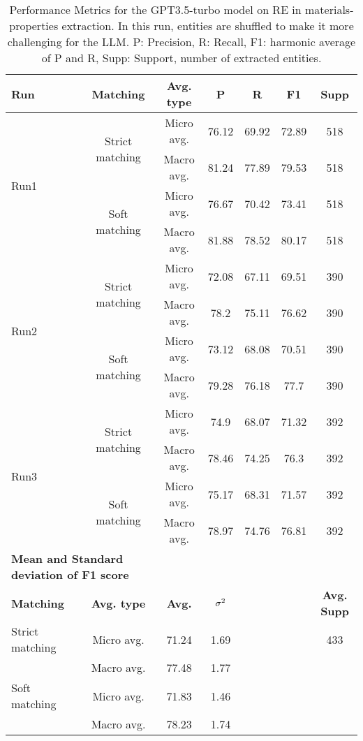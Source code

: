 \begin{table}[htbp]
    \small
    \centering
    \caption{Performance Metrics for the GPT3.5-turbo model on RE in materials-properties extraction. In this run, entities are shuffled to make it more challenging for the LLM. P: Precision, R: Recall, F1: harmonic average of P and R, Supp: Support, number of extracted entities.}
    \begin{tabular}{lcccccc}
        \toprule
        \textbf{Run} & \textbf{Matching} & \textbf{Avg. type} & \textbf{P} & \textbf{R} & \textbf{F1} & \textbf{Supp} \\
        \midrule
        \multirow{4}{*}{Run1} & \multirow{2}{*}{Strict matching} & Micro avg. & 76.12 & 69.92 & 72.89 & 518 \\
        & & Macro avg. & 81.24 & 77.89 & 79.53 & 518 \\
        \cmidrule{2-7}
        & \multirow{2}{*}{Soft matching} & Micro avg. & 76.67 & 70.42 & 73.41 & 518 \\
        & & Macro avg. & 81.88 & 78.52 & 80.17 & 518 \\
        \midrule
        \multirow{4}{*}{Run2} & \multirow{2}{*}{Strict matching} & Micro avg. & 72.08 & 67.11 & 69.51 & 390 \\
        & & Macro avg. & 78.2 & 75.11 & 76.62 & 390 \\
        \cmidrule{2-7}
        & \multirow{2}{*}{Soft matching} & Micro avg. & 73.12 & 68.08 & 70.51 & 390 \\
        & & Macro avg. & 79.28 & 76.18 & 77.7 & 390 \\
        \midrule
        \multirow{4}{*}{Run3} & \multirow{2}{*}{Strict matching} & Micro avg. & 74.9 & 68.07 & 71.32 & 392 \\
        & & Macro avg. & 78.46 & 74.25 & 76.3 & 392 \\
        \cmidrule{2-7}
        & \multirow{2}{*}{Soft matching} & Micro avg. & 75.17 & 68.31 & 71.57 & 392 \\
        & & Macro avg. & 78.97 & 74.76 & 76.81 & 392 \\
        \midrule
        \multicolumn{2}{l}{\textbf{Mean and Standard deviation of F1 score}} & & & & & \\
        \midrule
        \textbf{Matching} & \textbf{Avg. type} & \textbf{Avg.} & $\sigma\textsuperscript{2}$ & & & \textbf{Avg. Supp}\\
        Strict matching & Micro avg. & 71.24 & 1.69 & & & 433 \\
        & Macro avg. & 77.48 & 1.77 & & & \\
        Soft matching & Micro avg. & 71.83 & 1.46 & & \\
        & Macro avg. & 78.23 & 1.74 & & \\
        \bottomrule
    \end{tabular}
\end{table}

